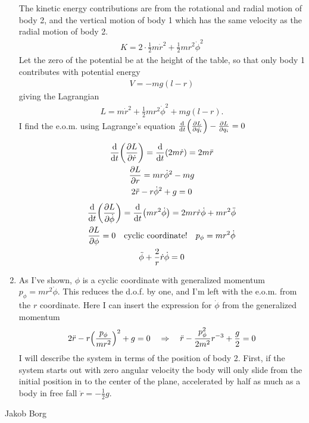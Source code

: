 \documentclass[11pt,a4paper]{report}
\newcounter{excount}[chapter]
\newenvironment{exercise}[1][]{\addtocounter{excount}{1} \noindent {\bf Problem
    \arabic{excount} \ \ #1}\hspace{2mm}}{\vspace{4mm}}
\newenvironment{solution}
    {\begin{tcolorbox}[title=Solution,halign lower=right,breakable]
    }
    {
    \tcblower Jakob Borg
    \end{tcolorbox}
	\vspace{5mm}
    }
\newcommand{\half}
{
\frac{1}{2}
}
\newcommand{\Leq}[1]
{
\dv{t}\qty(\pdv{L}{\dot{#1}}) - \pdv{L}{#1}
}
\newcommand{\Lpdv}[1]
{
\pdv{L}{#1}
}
\newcommand{\dvtLpdv}[1]
{
\dv{t} \qty(\Lpdv{#1}) 
}
\newcommand{\dvt}[1]
{
\dv{t} \qty(#1)
}
\newcommand{\dphi}
{
\dot{\phi}
}
\newcommand{\ddphi}
{
\ddot{\phi}
}
\begin{document}
\begin{exercise}
\begin{solution}
\begin{enumerate}[\bf a)]
The kinetic energy contributions are from the rotational and radial motion of body 2, and the vertical motion of body 1 which has the same velocity as the radial motion of body 2.
\begin{gather*}
K = 2\cdot \half m \dot{r}^2 + \half m r^2\dphi^2
\end{gather*}
Let the zero of the potential be at the height of the table, so that only body 1 contributes with potential energy
\begin{align*}
V = -mg(l-r)
\end{align*}
giving the Lagrangian
\begin{align*}
L = m\dot{r}^2 + \half m r^2 \dphi^2 + mg(l-r).
\end{align*}
I find the e.o.m. using Lagrange's equation $ \Leq{q_i} = 0$
\begin{multicols}{2}
\noindent
\begin{gather*}
\dvtLpdv{\dot{r}} = \dv{t}\qty( 2m\dot{r} ) = 2m\ddot{r}
\\
\Lpdv{r} = mr\dphi^2 -mg
\\
2\ddot{r} - r\dphi^2 + g = 0
\end{gather*}%
\begin{gather*}
\dvtLpdv{\dphi} = \dvt{mr^2\dphi} = 2mr\dot{r}\dphi + mr^2\ddphi
\\
\Lpdv{\phi} = 0 \qq{cyclic coordinate!} p_\phi = mr^2 \dphi 
\\
\ddphi + \frac{2}{r}\dot{r}\dphi= 0
\end{gather*}
\end{multicols}

\item As I've shown, $\phi$ is a cyclic coordinate with generalized momentum ${p_\phi = mr^2 \dphi }$. This reduces the d.o.f. by one, and I'm left with the e.o.m. from the $r$ coordinate. Here I can insert the expression for $\dphi$ from the generalized momentum
\begin{gather*}
2\ddot{r}-r\qty(\frac{p_\phi}{mr^2})^2 + g = 0 \quad
\Rightarrow \quad \ddot{r}- \frac{p_\phi^2}{2m^2}r^{-3} + \frac{g}{2} = 0
\end{gather*}
I will describe the system in terms of the position of body 2. First, if the system starts out with zero angular velocity the body will only slide from the initial position in to the center of the plane, accelerated by half as much as a body in free fall $\ddot{r} = -\half g$.


\end{enumerate}
\end{solution}
\end{exercise}
\end{document}
